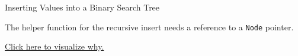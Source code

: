 \documentclass[14pt,aspectratio=1610]{beamer}
\begin{document}
\begin{frame}[fragile]{Inserting Values into a Binary Search Tree}
  \begin{center}
    \Large
    The helper function for the recursive insert needs a reference to a \texttt{Node} pointer.

    \href{https://pythontutor.com/visualize.html#code=class%20BinarySearchTree%0A%7B%0Apublic%3A%0A%20%20%20%20BinarySearchTree%28%29%20%3A%20mpRoot%7Bnullptr%7D%20%7B%7D%3B%0A%0A%20%20%20%20void%20insert%28const%20int%20val%29%3B%0A%0A%20%20%20%20~BinarySearchTree%28%29%3B%0A%0Aprivate%3A%0A%20%20%20%20struct%20Node%20%7B%0A%20%20%20%20%20%20%20%20Node%28const%20int%26%20val%29%0A%20%20%20%20%20%20%20%20%20%20%3A%20key%7Bval%7D,%20pLeft%7Bnullptr%7D,%20pRight%7Bnullptr%7D%0A%20%20%20%20%20%20%20%20%7B%7D%0A%20%20%20%20%20%20%20%20%0A%20%20%20%20%20%20%20%20~Node%28%29%0A%20%20%20%20%20%20%20%20%7B%0A%20%20%20%20%20%20%20%20%20%20delete%20pLeft%3B%0A%20%20%20%20%20%20%20%20%20%20delete%20pRight%3B%0A%20%20%20%20%20%20%20%20%7D%0A%20%20%20%20%20%20%20%20%0A%20%20%20%20%20%20%20%20int%20key%3B%0A%20%20%20%20%20%20%20%20Node%20*pLeft%3B%0A%20%20%20%20%20%20%20%20Node%20*pRight%3B%0A%20%20%20%20%7D%3B%0A%0A%20%20%20%20//%20Bug%3A%20need%20a%20reference%20to%20the%20node%20pointer%0A%20%20%20%20static%20void%20insert%28const%20int%20key,%20Node*%20pRoot%29%3B%0A%20%20%20%20%0A%20%20%20%20Node%20*mpRoot%3B%0A%7D%3B%0A%0A%0Aint%20main%28%29%0A%7B%0A%20%20%20%20BinarySearchTree%20tree%3B%0A%20%20%20%20tree.insert%2859%29%3B%0A%20%20%20%20tree.insert%2870%29%3B%0A%20%20%20%20tree.insert%2850%29%3B%0A%20%20%0A%20%20%20%20return%200%3B%0A%7D%0A%0Avoid%20BinarySearchTree%3A%3Ainsert%28const%20int%20key%29%0A%7B%0A%20%20%20%20insert%28key,%20mpRoot%29%3B%0A%7D%0A%0Avoid%20BinarySearchTree%3A%3Ainsert%28const%20int%20key,%20Node*%20pRoot%29%20%7B%0A%20%20%20%20if%20%28pRoot%20%3D%3D%20nullptr%29%20%7B%0A%20%20%20%20%20%20%20%20pRoot%20%3D%20new%20Node%7Bkey%7D%3B%0A%20%20%20%20%7D%0A%20%20%20%20else%20if%20%28key%20%3C%20pRoot-%3Ekey%29%20%7B%0A%20%20%20%20%20%20%20%20insert%28key,%20pRoot-%3EpLeft%29%3B%0A%20%20%20%20%7D%0A%20%20%20%20else%20%7B%0A%20%20%20%20%20%20%20%20insert%28key,%20pRoot-%3EpRight%29%3B%0A%20%20%20%20%7D%0A%7D%0A%0ABinarySearchTree%3A%3A~BinarySearchTree%28%29%20%7B%0A%20%20%20%20delete%20mpRoot%3B%0A%7D&cppShowMemAddrs=true&cumulative=false&curInstr=0&heapPrimitives=nevernest&mode=display&origin=opt-frontend.js&py=cpp_g%2B%2B9.3.0&rawInputLstJSON=%5B%5D&textReferences=false}{Click here to visualize why.}
  
  \end{center}
\end{frame}
\end{document}
